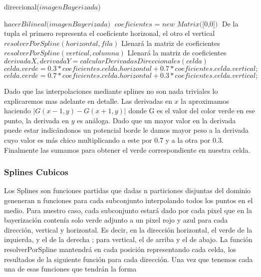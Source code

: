 \begin{algorithm}
\caption{direccional($imagenBayerizada$)}\label{euclid}
\begin{algorithmic}[1]
\State $\textit{hacerBilineal(imagenBayerizada)}$
\State $\textit{coeficientes $=$ new Matrix([0,0])}$ \Comment De la tupla el primero representa el coeficiente horizonal, el otro el vertical
  \State $resolverPorSpline(horizontal,fila)$ \Comment Llenará la matriz de coeficientes
\EndFor
{}
  \State $resolverPorSpline(vertical,columna)$ \Comment Llenará la matriz de coeficientes
\EndFor
{}
      \State $derivadaX,derivadaY = calcularDerivadasDireccionales(celda)$
        \State \textit{$celda.verde = 0.3 * coeficientes.celda.horizontal + 0.7 * coeficientes.celda.vertical;$}
      \Else
        \State \textit{$celda.verde = 0.7 * coeficientes.celda.horizontal + 0.3 * coeficientes.celda.vertical;$}
      \EndIf
  \EndIf
\EndFor
\end{algorithmic}
\end{algorithm}

Dado que las interpolaciones mediante splines no son nada triviales lo explicaremos mas adelante en detalle. Las derivadas en $x$  la aproximamos haciendo $|G(x-1,y)-G(x+1,y)|$ donde G es el valor del color verde en ese punto, la derivada en $y$ es análoga. Dado que un mayor valor en la derivada puede estar indicándonos un potencial borde le damos mayor peso a la derivada cuyo valor es más chico multiplicando a este por 0.7 y a la otra por 0.3. Finalmente las sumamos para obtener el verde correspondiente en nuestra celda.

\subsubsection{Splines Cubicos}
Los Splines son funciones partidas que dadas n particiones disjuntas del dominio geneneran n funciones para cada subconjunto interpolando todos los puntos en el medio. Para nuestro caso, cada subconjunto estará dado por cada pixel que en la bayerización contenía solo verde adjunto a un pixel rojo y azul para cada dirección, vertical y horizontal. Es decir, en la dirección horizontal, el verde de la izquierda, y el de la derecha ; para vertical, el de arriba y el de abajo. La función resolverPorSpline mantendrá en cada posición representando cada celda, los resultados de la siguiente función para cada dirección.
Una vez que tenemos cada una de esas funciones que tendrán la forma

